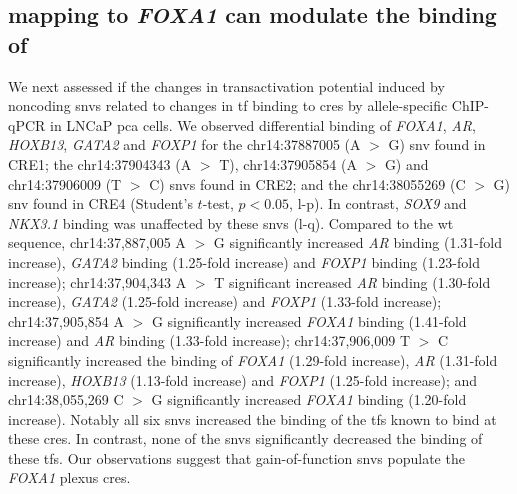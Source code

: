\subsection{ mapping to \emph{FOXA1}  can modulate the binding of }

We next assessed if the changes in transactivation potential induced by noncoding \glspl{snv} related to changes in \gls{tf} binding to \glspl{cre} by allele-specific ChIP-qPCR \cite{baileyNoncodingSomaticInherited2016,zhangIntegrativeFunctionalGenomics2012,cowper-sal*lariBreastCancerRisk2012} in LNCaP \gls{pca} cells.
We observed differential binding of \emph{FOXA1}, \emph{AR}, \emph{HOXB13}, \emph{GATA2} and \emph{FOXP1} for the chr14:37887005 (A $>$ G) \gls{snv} found in CRE1; the chr14:37904343 (A $>$ T), chr14:37905854 (A $>$ G) and chr14:37906009 (T $>$ C) \glspl{snv} found in CRE2; and the chr14:38055269 (C $>$ G) \gls{snv} found in CRE4 (Student's $t$-test, $p<0.05$, l-p).
In contrast, \emph{SOX9} and \emph{NKX3.1} binding was unaffected by these \glspl{snv} (l-q).
Compared to the \gls{wt} sequence, chr14:37,887,005 A $>$ G significantly increased \emph{AR} binding (1.31-fold increase), \emph{GATA2} binding (1.25-fold increase) and \emph{FOXP1} binding (1.23-fold increase); chr14:37,904,343 A $>$ T significant increased \emph{AR} binding (1.30-fold increase), \emph{GATA2} (1.25-fold increase) and \emph{FOXP1} (1.33-fold increase); chr14:37,905,854 A $>$ G significantly increased \emph{FOXA1} binding (1.41-fold increase) and \emph{AR} binding (1.33-fold increase); chr14:37,906,009 T $>$ C significantly increased the binding of \emph{FOXA1} (1.29-fold increase), \emph{AR} (1.31-fold increase), \emph{HOXB13} (1.13-fold increase) and \emph{FOXP1} (1.25-fold increase); and chr14:38,055,269 C $>$ G significantly increased \emph{FOXA1} binding (1.20-fold increase).
Notably all six \glspl{snv} increased the binding of the \glspl{tf} known to bind at these \glspl{cre}.
In contrast, none of the \glspl{snv} significantly decreased the binding of these \glspl{tf}.
Our observations suggest that gain-of-function \glspl{snv} populate the \emph{FOXA1} plexus \glspl{cre}.
